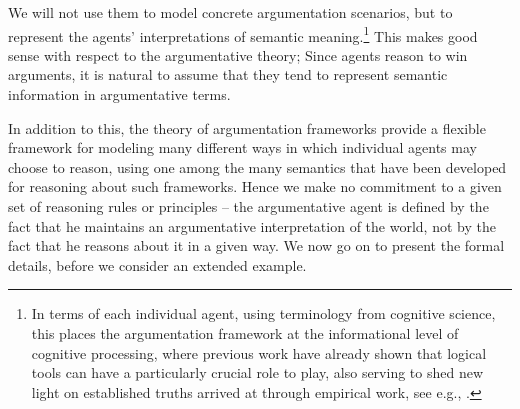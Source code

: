 \documentclass[greybox]{svmult}
\begin{document}
We will not use them to model concrete argumentation scenarios, but to represent the agents' interpretations of semantic meaning.\footnote{In terms of each individual agent, using terminology from cognitive science, this places the argumentation framework at the informational level of cognitive processing, where previous work have already shown that logical tools can have a particularly crucial role to play, also serving to shed new light on established truths arrived at through empirical work, see e.g., \cite{stenning}.} This makes good sense with respect to the argumentative theory; Since agents reason to win arguments, it is natural to assume that they tend to represent semantic information in argumentative terms.

In addition to this, the theory of argumentation frameworks provide a flexible framework for modeling many different ways in which individual agents may choose to reason, using one among the many semantics that have been developed for reasoning about such frameworks. Hence we make no commitment to a given set of reasoning rules or principles -- the argumentative agent is defined by the fact that he maintains an argumentative interpretation of the world, not by the fact that he reasons about it in a given way. We now go on to present the formal details, before we consider an extended example.

\end{document}

